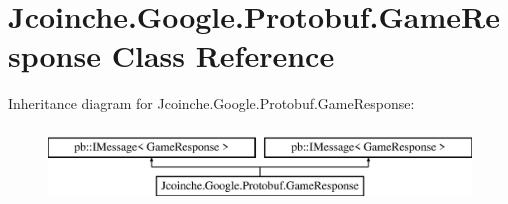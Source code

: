 \hypertarget{class_jcoinche_1_1_google_1_1_protobuf_1_1_game_response}{}\section{Jcoinche.\+Google.\+Protobuf.\+Game\+Response Class Reference}
\label{class_jcoinche_1_1_google_1_1_protobuf_1_1_game_response}
Inheritance diagram for Jcoinche.\+Google.\+Protobuf.\+Game\+Response\+:\begin{figure}[H]
\begin{center}
\leavevmode
\includegraphics[height=2.000000cm]{class_jcoinche_1_1_google_1_1_protobuf_1_1_game_response}
\end{center}
\end{figure}
